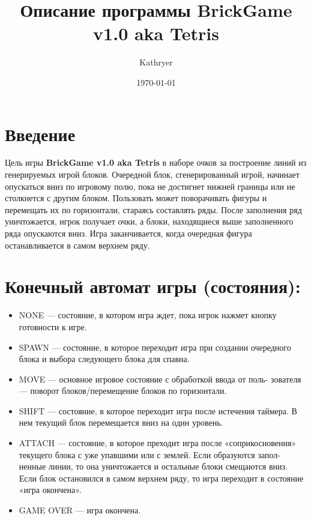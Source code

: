 \documentclass{article}
\title{Описание программы BrickGame v1.0 aka Tetris}
\author{Kathryer}
\date{\today}
\begin{document}
\maketitle

\section{Введение}

Цель игры \textbf{BrickGame v1.0 aka Tetris} в наборе очков за построение линий
\newline из генерируемых игрой блоков. Очередной блок, сгенерированный игрой, 
\newline начинает опускаться вниз по игровому полю, пока не достигнет нижней 
\newline границы или не столкнется с другим блоком. Пользовать может поворачивать
\newline фигуры и перемещать их по горизонтали, стараясь составлять ряды. После 
\newline заполнения ряд уничтожается, игрок получает очки, а блоки, находящиеся 
\newline выше заполненного ряда опускаются вниз. Игра заканчивается, когда 
\newline очередная фигура останавливается в самом верхнем ряду.

\section{Конечный автомат игры (состояния): }
\begin{itemize}
    \item NONE — состояние, в котором игра ждет, пока игрок нажмет кнопку
    \newline готовности к игре.
    \item SPAWN — состояние, в которое переходит игра при создании очередного
    \newline блока и выбора следующего блока для спавна.
    \item MOVE — основное игровое состояние с обработкой ввода от поль-
    \newline зователя — поворот блоков/перемещение блоков по горизонтали.
    \item SHIFT — состояние, в которое переходит игра после истечения таймера. 
    \newline В нем текущий блок перемещается вниз на один уровень.
    \item ATTACH — состояние, в которое преходит игра после «соприкосновения»
    \newline текущего блока с уже упавшими или с землей. Если образуются запол-
    \newline ненные линии, то она уничтожается и остальные блоки смещаются вниз. 
    \newline Если блок остановился в самом верхнем ряду, то игра переходит в 
    \newline состояние «игра окончена».
    \item GAME OVER — игра окончена.
\end{itemize}
\end{document}
